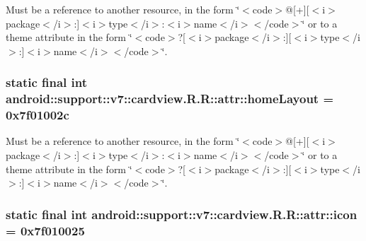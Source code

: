 Must be a reference to another resource, in the form \char`\"{}$<$code$>$@\mbox{[}+\mbox{]}\mbox{[}$<$i$>$package$<$/i$>$:\mbox{]}$<$i$>$type$<$/i$>$:$<$i$>$name$<$/i$>$$<$/code$>$\char`\"{} or to a theme attribute in the form \char`\"{}$<$code$>$?\mbox{[}$<$i$>$package$<$/i$>$:\mbox{]}\mbox{[}$<$i$>$type$<$/i$>$:\mbox{]}$<$i$>$name$<$/i$>$$<$/code$>$\char`\"{}. \hypertarget{classandroid_1_1support_1_1v7_1_1cardview_1_1_r_1_1attr_90ff2905ef249911ce22255c5ccaa62e}{
\subsubsection[{homeLayout}]{\setlength{\rightskip}{0pt plus 5cm}static final int android::support::v7::cardview.R.R::attr::homeLayout = 0x7f01002c}}
\label{classandroid_1_1support_1_1v7_1_1cardview_1_1_r_1_1attr_90ff2905ef249911ce22255c5ccaa62e}


Must be a reference to another resource, in the form \char`\"{}$<$code$>$@\mbox{[}+\mbox{]}\mbox{[}$<$i$>$package$<$/i$>$:\mbox{]}$<$i$>$type$<$/i$>$:$<$i$>$name$<$/i$>$$<$/code$>$\char`\"{} or to a theme attribute in the form \char`\"{}$<$code$>$?\mbox{[}$<$i$>$package$<$/i$>$:\mbox{]}\mbox{[}$<$i$>$type$<$/i$>$:\mbox{]}$<$i$>$name$<$/i$>$$<$/code$>$\char`\"{}. \hypertarget{classandroid_1_1support_1_1v7_1_1cardview_1_1_r_1_1attr_307d3d873ad01ff0e7d1d47d49a6609c}{
\subsubsection[{icon}]{\setlength{\rightskip}{0pt plus 5cm}static final int android::support::v7::cardview.R.R::attr::icon = 0x7f010025}}
\label{classandroid_1_1support_1_1v7_1_1cardview_1_1_r_1_1attr_307d3d873ad01ff0e7d1d47d49a6609c}



